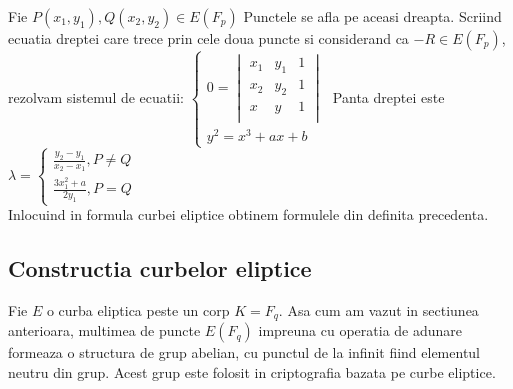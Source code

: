 \begin{dem}
Fie $P(x_1, y_1), Q(x_2, y_2)\in E(F_p)$ Punctele se afla pe aceasi dreapta. Scriind ecuatia dreptei care trece prin cele doua puncte si considerand ca $-R\in E(F_p)$, rezolvam sistemul de ecuatii:
$\begin{cases} 
    0 = \begin{vmatrix}
			x_1 & y_1 & 1 \\ 
			x_2 & y_2 & 1 \\ 
			x & y & 1  \\ 
			\end{vmatrix} \\
    y^2 =  x^3 + ax + b
   \end{cases}$
   Panta dreptei este $\lambda = \begin{cases}
 \frac{y_2 - y_1}{x_2 - x_1}, P \neq Q \\ 
 \frac{3x^{2}_1 + a}{2y_1}, P = Q
 \end{cases}$
 \\Inlocuind in formula curbei eliptice obtinem formulele din definita precedenta.
\end{dem}

\subsection{Constructia curbelor eliptice}
\label{subsec:subsec02}

Fie $E$ o curba eliptica peste un corp $K = F_q$. Asa cum am vazut in sectiunea anterioara, multimea de puncte $E(F_q)$ impreuna cu operatia de adunare formeaza o structura de grup abelian, cu punctul de la infinit fiind elementul neutru din grup. Acest grup este folosit in criptografia bazata pe curbe eliptice.


